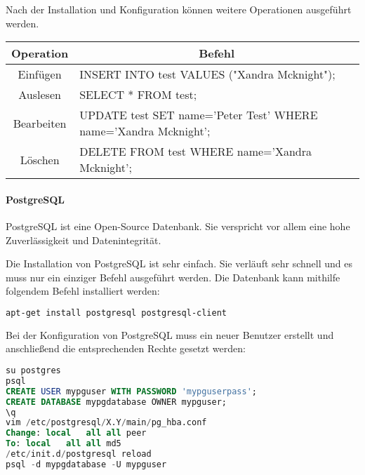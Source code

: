 Nach der Installation und Konfiguration können weitere Operationen ausgeführt werden.

\begin{table}[htb]
\def\arraystretch{1.3}
\centering
\begin{tabular}{|c|l|}
\hline
\textbf{Operation} & \multicolumn{1}{c|}{\textbf{Befehl}}                            \\ \hline
Einfügen           & INSERT INTO test VALUES ("Xandra Mcknight");                    \\ \hline
Auslesen           & SELECT * FROM test;                                             \\ \hline
Bearbeiten         & UPDATE test SET name='Peter Test' WHERE name='Xandra Mcknight'; \\ \hline
Löschen            & DELETE FROM test WHERE name='Xandra Mcknight';                  \\ \hline
\end{tabular}
\end{table}

\paragraph{PostgreSQL}
PostgreSQL ist eine Open-Source Datenbank. Sie verspricht vor allem eine hohe Zuverlässigkeit und Datenintegrität.\cite{ABOUTPOSTGRES}

Die Installation von PostgreSQL ist sehr einfach. Sie verläuft sehr schnell und es muss nur ein einziger Befehl ausgeführt werden. Die Datenbank kann mithilfe folgendem Befehl installiert werden:
\begin{lstlisting}[caption=Installation von PostgreSQL \cite{POSTGRES}, language=bash]
apt-get install postgresql postgresql-client
\end{lstlisting}

\newpage

Bei der Konfiguration von PostgreSQL muss ein neuer Benutzer erstellt und anschließend die entsprechenden Rechte gesetzt werden:
\begin{lstlisting}[caption=Konfiguration von PostgreSQL \cite{POSTGRES}, language=SQL]
su postgres
psql
CREATE USER mypguser WITH PASSWORD 'mypguserpass';
CREATE DATABASE mypgdatabase OWNER mypguser;
\q
vim /etc/postgresql/X.Y/main/pg_hba.conf
Change: local	all	all	peer
To: local	all	all	md5
/etc/init.d/postgresql reload
psql -d mypgdatabase -U mypguser
\end{lstlisting}

